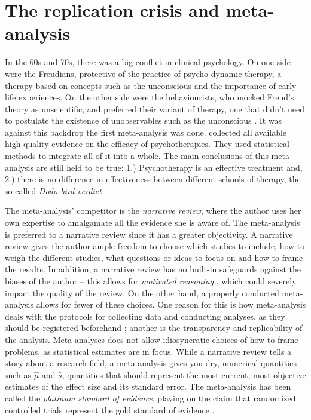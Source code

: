\section{The replication crisis and meta-analysis}

In the 60s and 70s, there was a big conflict in clinical psychology. On one side were the Freudians, protective of the practice of psycho-dynamic therapy, a therapy based on concepts such as the unconscious and the importance of early life experiences. On the other side were the behaviourists, who mocked Freud's theory as unscientific, and preferred their variant of therapy, one that didn't need to postulate the existence of unobservables such as the unconscious \parencite[Chapter 4]{Wampold2019-fe}. It was against this backdrop the first meta-analysis was done. \textcite{Smith1977-vw} collected all available high-quality evidence on the efficacy of psychotherapies. They used statistical methods to integrate all of it into a whole. The main conclusions of this meta-analysis are still held to be true: 1.) Psychotherapy is an effective treatment and, 2.) there is no difference in effectiveness between different schools of therapy, the so-called \emph{Dodo bird verdict.}

The meta-analysis' competitor is the \emph{narrative review}, where the author uses her own expertise to amalgamate all the evidence she is aware of. The meta-analysis is preferred to a narrative review since it has a greater objectivity. A narrative review gives the author ample freedom to choose which studies to include, how to weigh the different studies, what questions or ideas to focus on and how to frame the results. In addition, a narrative review has no built-in safeguards against the biases of the author -- this allows for \emph{motivated reasoning} \parencite{Kunda1990-ry}, which could severely impact the quality of the review. On the other hand, a properly conducted meta-analysis allows for fewer of these choices. One reason for this is how meta-analysis deals with the protocols for collecting data and conducting analyses, as they should be registered beforehand \parencite{Egger1997-ue}; another is the transparency and replicability of the analysis. Meta-analyses does not allow idiosyncratic choices of how to frame problems, as statistical estimates are in focus. While a narrative review tells a story about a research field, a meta-analysis gives you dry, numerical quantities such as $\widehat{\mu}$ and $\widehat{s}$, quantities that should represent the most current, most objective estimates of the effect size and its standard error. The meta-analysis has been called the \emph{platinum standard of evidence}, playing on the claim that randomized controlled trials represent the gold standard of evidence \parencite{Stegenga2011-zo}.


